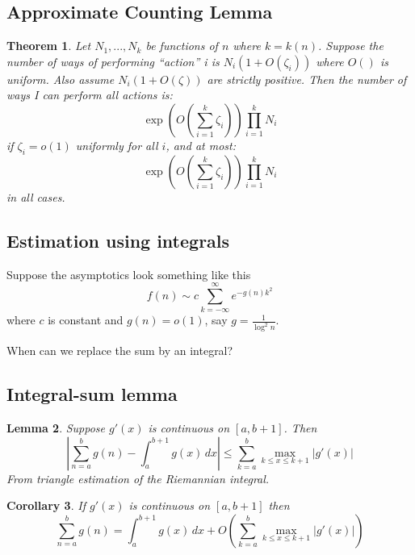 \documentclass[]{article}
\newtheorem{theorem}{Theorem}
\newtheorem{corollary}[theorem]{Corollary}
\newtheorem{lemma}[theorem]{Lemma}
\theoremstyle{definition}
\numberwithin{theorem}{section}
\numberwithin{equation}{section}
\begin{document}
\subsection{Approximate Counting Lemma}
\begin{theorem}
	Let $N_1, ..., N_k$ be functions of $n$ where $k = k(n)$. Suppose the number of ways of performing ``action'' i is $N_i( 1 + O(\zeta_i))$ where $O()$ is uniform. Also assume $N_i(1 + O(\zeta))$ are strictly positive. Then the number of ways I can perform all actions is:
	\begin{equation}
		\exp\left(O\left(\sum_{i = 1}^{k}\zeta_i\right)\right) \prod_{i = 1}^k N_i
	\end{equation}
	if $\zeta_i = o(1)$ uniformly for all $i$, and at most:
		\begin{equation}
		\exp\left(O\left(\sum_{i = 1}^{k}\zeta_i\right)\right) \prod_{i = 1}^k N_i
	\end{equation}
	in all cases. 
\end{theorem}

\subsection{Estimation using integrals}
Suppose the asymptotics look something like this
\begin{equation}
	f(n) \sim c\sum_{k = -\infty}^{\infty} e^{-g(n) k^2}
\end{equation}
where $c$ is constant and $g(n) = o(1)$, say $g = \frac{1}{\log^2 n}$.

When can we replace the sum by an integral?

\subsection{Integral-sum lemma}
\begin{lemma}
		Suppose $g'(x)$ is continuous on $[a, b + 1]$. Then
	\begin{equation}
		\left| \sum_{n = a}^{b} g(n) - \int_{a}^{b + 1}g(x)\, dx\right| \leq \sum_{k = a}^{b} \max_{k \leq x \leq k + 1} |g'(x)|
	\end{equation}
	From triangle estimation of the Riemannian integral. 
\end{lemma}

\begin{corollary}
	If $g'(x)$ is continuous on $[a, b + 1]$ then
	\begin{equation}
		\sum_{n = a}^{b} g(n)  = \int_{a}^{b + 1}g(x) \, dx+ O\left( \sum_{k = a}^{b} \max_{k \leq x \leq k + 1} |g'(x)| \right)
	\end{equation}
\end{corollary}
\end{document}
